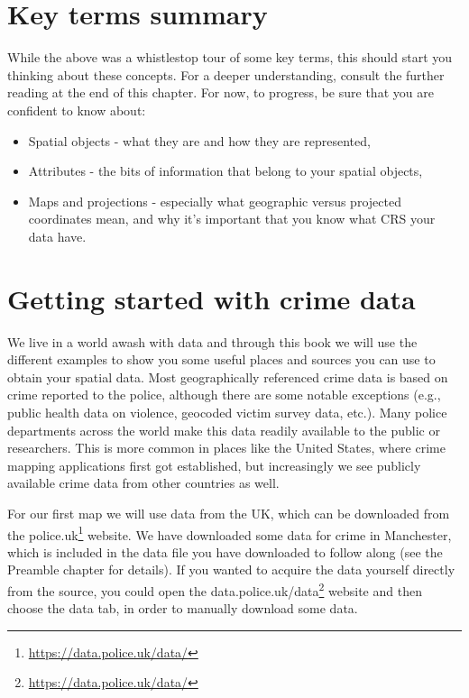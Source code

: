 \documentclass[
  krantz2]{krantz}
\providecommand{\tightlist}{%
  \setlength{\itemsep}{0pt}\setlength{\parskip}{0pt}}
\renewcommand{\href}[2]{#2\footnote{\url{#1}}}
\begin{document}
\hypertarget{key-terms-summary}{%
\section{Key terms summary}\label{key-terms-summary}}

While the above was a whistlestop tour of some key terms, this should start you thinking about these concepts. For a deeper understanding, consult the further reading at the end of this chapter. For now, to progress, be sure that you are confident to know about:

\begin{itemize}
\tightlist
\item
  Spatial objects - what they are and how they are represented,
\item
  Attributes - the bits of information that belong to your spatial objects,
\item
  Maps and projections - especially what geographic versus projected coordinates mean, and why it's important that you know what CRS your data have.
\end{itemize}

\hypertarget{getting-started-with-crime-data}{%
\section{Getting started with crime data}\label{getting-started-with-crime-data}}

We live in a world awash with data and through this book we will use the different examples to show you some useful places and sources you can use to obtain your spatial data. Most geographically referenced crime data is based on crime reported to the police, although there are some notable exceptions (e.g., public health data on violence, geocoded victim survey data, etc.). Many police departments across the world make this data readily available to the public or researchers. This is more common in places like the United States, where crime mapping applications first got established, but increasingly we see publicly available crime data from other countries as well.

For our first map we will use data from the UK, which can be downloaded from the \href{https://data.police.uk/data/}{police.uk} website. We have downloaded some data for crime in Manchester, which is included in the data file you have downloaded to follow along (see the Preamble chapter for details). If you wanted to acquire the data yourself directly from the source, you could open the \href{https://data.police.uk/data/}{data.police.uk/data} website and then choose the data tab, in order to manually download some data.
\end{document}
